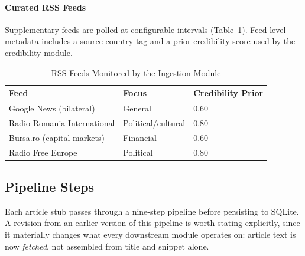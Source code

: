 \documentclass[conference]{IEEEtran}
\begin{document}
\paragraph{Curated RSS Feeds}
Supplementary feeds are polled at configurable intervals (Table~\ref{tab:feeds}).
Feed-level metadata includes a source-country tag and a prior credibility
score used by the credibility module.

\begin{table}[htbp]
\caption{RSS Feeds Monitored by the Ingestion Module}
\label{tab:feeds}
\centering
\small
\begin{tabular}{lll}
\toprule
\textbf{Feed} & \textbf{Focus} & \textbf{Credibility Prior} \\
\midrule
Google News (bilateral) & General & 0.60 \\
Radio Romania International & Political/cultural & 0.80 \\
Bursa.ro (capital markets) & Financial & 0.60 \\
Radio Free Europe & Political & 0.80 \\
\bottomrule
\end{tabular}
\end{table}

\subsection{Pipeline Steps}

Each article stub passes through a nine-step pipeline before persisting to
SQLite. A revision from an earlier version of this pipeline is worth
stating explicitly, since it materially changes what every downstream
module operates on: article text is now \emph{fetched}, not assembled from
title and snippet alone.
\end{document}
